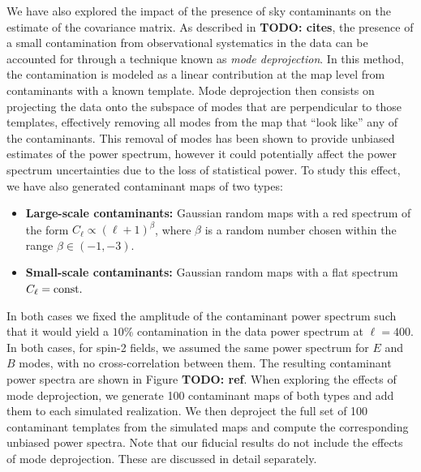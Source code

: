 \documentclass[a4paper,11pt]{article}
\newcommand{\todo}[1]{{\bf TODO: #1}}
\begin{document}
      We have also explored the impact of the presence of sky contaminants on the estimate of the covariance matrix. As described in \todo{cites}, the presence of a small contamination from observational systematics in the data can be accounted for through a technique known as {\sl mode deprojection}. In this method, the contamination is modeled as a linear contribution at the map level from contaminants with a known template. Mode deprojection then consists on projecting the data onto the subspace of modes that are perpendicular to those templates, effectively removing all modes from the map that ``look like'' any of the contaminants. This removal of modes has been shown to provide unbiased estimates of the power spectrum, however it could potentially affect the power spectrum uncertainties due to the loss of statistical power. To study this effect, we have also generated contaminant maps of two types:
      \begin{itemize}
        \item {\bf Large-scale contaminants:} Gaussian random maps with a red spectrum of the form $C_\ell\propto (\ell+1)^\beta$, where $\beta$ is a random number chosen within the range $\beta\in(-1,-3)$.
        \item {\bf Small-scale contaminants:} Gaussian random maps with a flat spectrum $C_\ell={\rm const.}$
      \end{itemize}
      In both cases we fixed the amplitude of the contaminant power spectrum such that it would yield a $10\%$ contamination in the data power spectrum at $\ell=400$. In both cases, for spin-2 fields, we assumed the same power spectrum for $E$ and $B$ modes, with no cross-correlation between them. The resulting contaminant power spectra are shown in Figure \todo{ref}. When exploring the effects of mode deprojection, we generate 100 contaminant maps of both types and add them to each simulated realization. We then deproject the full set of 100 contaminant templates from the simulated maps and compute the corresponding unbiased power spectra. Note that our fiducial results do not include the effects of mode deprojection. These are discussed in detail separately.
\end{document}
